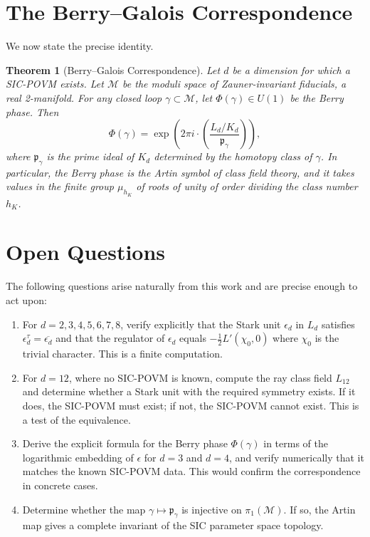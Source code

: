 \documentclass[12pt]{article}
\newtheorem{theorem}{Theorem}
\begin{document}
\section{The Berry–Galois Correspondence}

We now state the precise identity.

\begin{theorem}[Berry–Galois Correspondence]
Let $d$ be a dimension for which a SIC-POVM exists. Let $\mathcal{M}$ be the moduli space of Zauner-invariant fiducials, a real 2-manifold. For any closed loop $\gamma \subset \mathcal{M}$, let $\Phi(\gamma) \in U(1)$ be the Berry phase. Then
\[
\Phi(\gamma) = \exp\left( 2\pi i \cdot \left( \frac{L_d/K_d}{\mathfrak{p}_\gamma} \right) \right),
\]
where $\mathfrak{p}_\gamma$ is the prime ideal of $K_d$ determined by the homotopy class of $\gamma$. In particular, the Berry phase is the Artin symbol of class field theory, and it takes values in the finite group $\mu_{h_K}$ of roots of unity of order dividing the class number $h_K$.
\end{theorem}

\section{Open Questions}

The following questions arise naturally from this work and are precise enough to act upon:

\begin{enumerate}
\item For $d = 2, 3, 4, 5, 6, 7, 8$, verify explicitly that the Stark unit $\epsilon_d$ in $L_d$ satisfies $\epsilon_d^\tau = \overline{\epsilon_d}$ and that the regulator of $\epsilon_d$ equals $-\frac{1}{2}L'(\chi_0, 0)$ where $\chi_0$ is the trivial character. This is a finite computation.

\item For $d = 12$, where no SIC-POVM is known, compute the ray class field $L_{12}$ and determine whether a Stark unit with the required symmetry exists. If it does, the SIC-POVM must exist; if not, the SIC-POVM cannot exist. This is a test of the equivalence.

\item Derive the explicit formula for the Berry phase $\Phi(\gamma)$ in terms of the logarithmic embedding of $\epsilon$ for $d = 3$ and $d = 4$, and verify numerically that it matches the known SIC-POVM data. This would confirm the correspondence in concrete cases.

\item Determine whether the map $\gamma \mapsto \mathfrak{p}_\gamma$ is injective on $\pi_1(\mathcal{M})$. If so, the Artin map gives a complete invariant of the SIC parameter space topology.
\end{enumerate}
\end{document}
